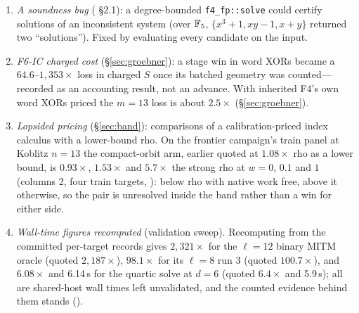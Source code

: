 \begin{enumerate}
  versus 300{,}531), with every scalar, trial count and charged GAE
  unchanged. The failed receipt is kept; the F4 stage comparison is
  historical until the drift is explained. A replay of the same session on
  current \texttt{main} (20 October) matches only 72/168, with mismatches
  in all four IC arms, root finding included. The cause was then isolated:
  an x86-only BMI2 rewrite in inherited F4 counts word XORs differently from
  the portable path; with it disabled the replay is 168/168 on x86 and on
  emulated aarch64
  ().
  F4 counts are comparable across instruction sets only when the path is
  stated, which the method identity does not yet record.
\item \emph{A soundness bug} (
  \S2.1): a degree-bounded \texttt{f4\_fp::solve} could certify solutions
  of an inconsistent system (over $\mathbb{F}_5$, $\{x^3+1,xy-1,x+y\}$ returned
  two ``solutions''). Fixed by evaluating every candidate on the input.
\item \emph{F6-IC charged cost} (\S\ref{sec:groebner}): a stage win in
  word XORs became a $64.6$--$1{,}353\times$ loss in charged $S$ once its
  batched geometry was counted---recorded as an accounting result, not an
  advance. With inherited F4's own word XORs priced the $m=13$ loss is about
  $2.5\times$ (\S\ref{sec:groebner}).
\item \emph{Lopsided pricing} (\S\ref{sec:band}): comparisons of a
  calibration-priced index calculus with a lower-bound rho. On the
  frontier campaign's train panel at Koblitz $n=13$ the compact-orbit arm,
  earlier quoted at $1.08\times$ rho as a lower bound, is $0.93\times$,
  $1.53\times$ and $5.7\times$ the strong rho at $w=0$, $0.1$ and $1$
  (columns 2, four train targets,
  ): below
  rho with native work free, above it otherwise, so the pair is unresolved
  inside the band rather than a win for either side.
\item \emph{Wall-time figures recomputed} (validation sweep). Recomputing
  from the committed per-target records gives $2{,}321\times$ for the
  $\ell=12$ binary MITM oracle (quoted $2{,}187\times$), $98.1\times$ for its
  $\ell=8$ run 3 (quoted $100.7\times$), and $6.08\times$ and 6.14\,s for the
  quartic solve at $d=6$ (quoted $6.4\times$ and 5.9\,s); all are shared-host
  wall times left unvalidated, and the counted evidence behind them stands
  ().

\end{enumerate}
